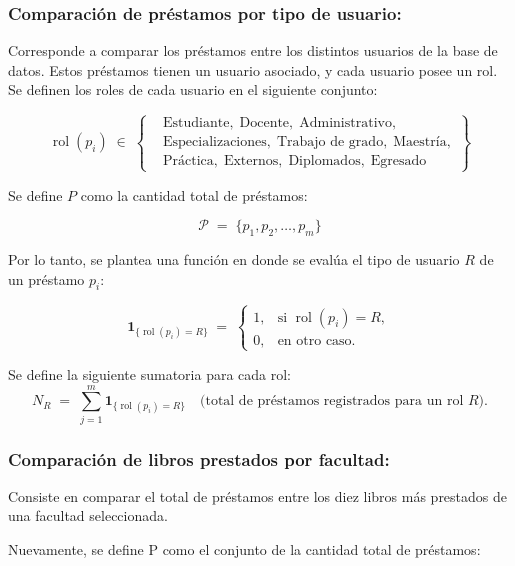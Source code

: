 \documentclass[spanish]{ieee_upb}
\begin{document}
\subsubsection{Comparación de préstamos por tipo de usuario:}
Corresponde a comparar los préstamos entre los distintos usuarios de la base de datos. Estos préstamos tienen un usuario asociado, y cada usuario posee un rol. Se definen los roles de cada usuario en el siguiente conjunto:

\[
  \operatorname{rol}(p_i)\;\in\;
  \left\{
    \begin{aligned}
      &\text{Estudiante},\;\text{Docente},\;\text{Administrativo},\\
      &\text{Especializaciones},\;\text{Trabajo de grado},\;\text{Maestría},\\
      &\text{Práctica},\;\text{Externos},\;\text{Diplomados},\;\text{Egresado}
    \end{aligned}
  \right\}
\]

\vspace{0.3cm}

Se define \(P\) como la cantidad total de préstamos:

\[
  \mathcal{P}\;=\;\{
      p_1,p_2,\dots,p_m
  \}
\]

Por lo tanto, se plantea una función en donde se evalúa el tipo de usuario \(R\) de un préstamo \(p_i\):

\[
  \mathbf 1_{\{\operatorname{rol}(p_i)=R\}}
  \;=\;
  \begin{cases}
    1, & \text{si } \operatorname{rol}(p_i)=R,\\[4pt]
    0, & \text{en otro caso.}
  \end{cases}
\]

Se define la siguiente sumatoria para cada rol:
\[
  N_R
  \;=\;
  \sum_{j=1}^{m}
    \mathbf 1_{\{\operatorname{rol}(p_i)=R\}}
  \quad
  \bigl(\text{total de préstamos registrados para un rol }R\bigr).
\]


\subsubsection{Comparación de libros prestados por facultad: }
Consiste en comparar el total de préstamos entre los diez libros más prestados de una facultad seleccionada.

Nuevamente, se define P como el conjunto de la cantidad total de préstamos:
\end{document}
